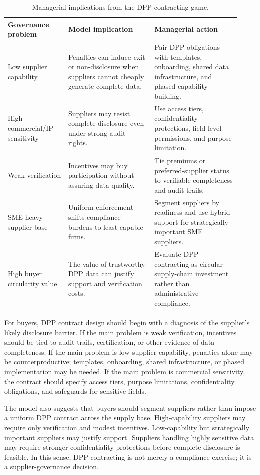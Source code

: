 \documentclass[final,5p,times,authoryear]{elsarticle}
\begin{document}
\begin{table}[t]
\centering
\begingroup
\setlength{\tabcolsep}{3pt}
\small
\caption{Managerial implications from the DPP contracting game.}
\label{tab:managerial_implications}
\begin{tabular}{@{}p{0.24\linewidth}p{0.34\linewidth}p{0.34\linewidth}@{}}
\toprule
Governance problem & Model implication & Managerial action \\
\midrule
Low supplier capability & Penalties can induce exit or non-disclosure when suppliers cannot cheaply generate complete data. & Pair DPP obligations with templates, onboarding, shared data infrastructure, and phased capability-building. \\
High commercial/IP sensitivity & Suppliers may resist complete disclosure even under strong audit rights. & Use access tiers, confidentiality protections, field-level permissions, and purpose limitation. \\
Weak verification & Incentives may buy participation without assuring data quality. & Tie premiums or preferred-supplier status to verifiable completeness and audit trails. \\
SME-heavy supplier base & Uniform enforcement shifts compliance burdens to least capable firms. & Segment suppliers by readiness and use hybrid support for strategically important SME suppliers. \\
High buyer circularity value & The value of trustworthy DPP data can justify support and verification costs. & Evaluate DPP contracting as circular supply-chain investment rather than administrative compliance. \\
\bottomrule
\end{tabular}
\endgroup
\end{table}

For buyers, DPP contract design should begin with a diagnosis of the supplier's likely disclosure barrier. If the main problem is weak verification, incentives should be tied to audit trails, certification, or other evidence of data completeness. If the main problem is low supplier capability, penalties alone may be counterproductive; templates, onboarding, shared infrastructure, or phased implementation may be needed. If the main problem is commercial sensitivity, the contract should specify access tiers, purpose limitations, confidentiality obligations, and safeguards for sensitive fields.

The model also suggests that buyers should segment suppliers rather than impose a uniform DPP contract across the supply base. High-capability suppliers may require only verification and modest incentives. Low-capability but strategically important suppliers may justify support. Suppliers handling highly sensitive data may require stronger confidentiality protections before complete disclosure is feasible. In this sense, DPP contracting is not merely a compliance exercise; it is a supplier-governance decision.
\end{document}
